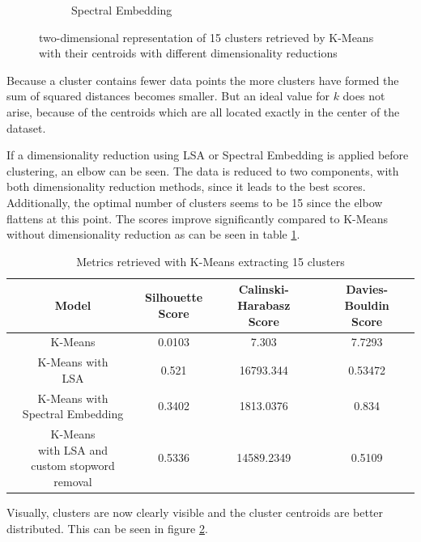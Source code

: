 \begin{figure}
\begin{subfigure}{.3\textwidth}
  \caption{Spectral Embedding}
  \label{fig:kmeans_spectral}
\end{subfigure}
\caption{two-dimensional representation of 15 clusters retrieved by K-Means with their centroids with different dimensionality reductions}
\label{fig:kmeans}
\end{figure}
Because a cluster contains fewer data points the more clusters have formed the sum of squared distances becomes smaller.
But an ideal value for $k$ does not arise, because of the centroids which are all located exactly in the center of the dataset.

If a dimensionality reduction using LSA or Spectral Embedding is applied before clustering, an elbow can be seen.
The data is reduced to two components, with both dimensionality reduction methods, since it leads to the best scores.
Additionally, the optimal number of clusters seems to be 15 since the elbow flattens at this point.
The scores improve significantly compared to K-Means without dimensionality reduction as can be seen in table \ref{tab:scores_kmeans}.
\begin{table}[]
    \centering
    \begin{tabular}{c|c|c|c}
     Model &  \shortstack[c]{Silhouette \\ Score} & \shortstack[c]{Calinski-Harabasz \\ Score} &  \shortstack[c]{Davies-Bouldin \\ Score}  \\
     \hline
     \hline
     K-Means & 0.0103 & 7.303 & 7.7293 \\
     \hline
     \shortstack[c]{K-Means with \\ LSA} & 0.521 & 16793.344 & 0.53472 \\
     \hline
     \shortstack[c]{K-Means with \\ Spectral Embedding} & 0.3402 & 1813.0376 & 0.834 \\
     \hline
     \shortstack[c]{K-Means \\ with LSA and \\ custom stopword removal} & 0.5336 & 14589.2349 & 0.5109 \\

    \end{tabular}
    \caption{Metrics retrieved with K-Means extracting 15 clusters}
    \label{tab:scores_kmeans}
\end{table}
Visually, clusters are now clearly visible and the cluster centroids are better distributed.
This can be seen in figure \ref{fig:kmeans}.

